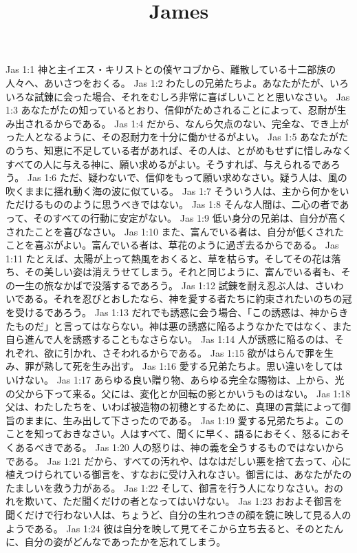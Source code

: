 

\title{James}

Jas 1:1  神と主イエス・キリストとの僕ヤコブから、離散している十二部族の人々へ、あいさつをおくる。
Jas 1:2  わたしの兄弟たちよ。あなたがたが、いろいろな試錬に会った場合、それをむしろ非常に喜ばしいことと思いなさい。
Jas 1:3  あなたがたの知っているとおり、信仰がためされることによって、忍耐が生み出されるからである。
Jas 1:4  だから、なんら欠点のない、完全な、でき上がった人となるように、その忍耐力を十分に働かせるがよい。
Jas 1:5  あなたがたのうち、知恵に不足している者があれば、その人は、とがめもせずに惜しみなくすべての人に与える神に、願い求めるがよい。そうすれば、与えられるであろう。
Jas 1:6  ただ、疑わないで、信仰をもって願い求めなさい。疑う人は、風の吹くままに揺れ動く海の波に似ている。
Jas 1:7  そういう人は、主から何かをいただけるもののように思うべきではない。
Jas 1:8  そんな人間は、二心の者であって、そのすべての行動に安定がない。
Jas 1:9  低い身分の兄弟は、自分が高くされたことを喜びなさい。
Jas 1:10  また、富んでいる者は、自分が低くされたことを喜ぶがよい。富んでいる者は、草花のように過ぎ去るからである。
Jas 1:11  たとえば、太陽が上って熱風をおくると、草を枯らす。そしてその花は落ち、その美しい姿は消えうせてしまう。それと同じように、富んでいる者も、その一生の旅なかばで没落するであろう。
Jas 1:12  試錬を耐え忍ぶ人は、さいわいである。それを忍びとおしたなら、神を愛する者たちに約束されたいのちの冠を受けるであろう。
Jas 1:13  だれでも誘惑に会う場合、「この誘惑は、神からきたものだ」と言ってはならない。神は悪の誘惑に陥るようなかたではなく、また自ら進んで人を誘惑することもなさらない。
Jas 1:14  人が誘惑に陥るのは、それぞれ、欲に引かれ、さそわれるからである。
Jas 1:15  欲がはらんで罪を生み、罪が熟して死を生み出す。
Jas 1:16  愛する兄弟たちよ。思い違いをしてはいけない。
Jas 1:17  あらゆる良い贈り物、あらゆる完全な賜物は、上から、光の父から下って来る。父には、変化とか回転の影とかいうものはない。
Jas 1:18  父は、わたしたちを、いわば被造物の初穂とするために、真理の言葉によって御旨のままに、生み出して下さったのである。
Jas 1:19  愛する兄弟たちよ。このことを知っておきなさい。人はすべて、聞くに早く、語るにおそく、怒るにおそくあるべきである。
Jas 1:20  人の怒りは、神の義を全うするものではないからである。
Jas 1:21  だから、すべての汚れや、はなはだしい悪を捨て去って、心に植えつけられている御言を、すなおに受け入れなさい。御言には、あなたがたのたましいを救う力がある。
Jas 1:22  そして、御言を行う人になりなさい。おのれを欺いて、ただ聞くだけの者となってはいけない。
Jas 1:23  おおよそ御言を聞くだけで行わない人は、ちょうど、自分の生れつきの顔を鏡に映して見る人のようである。
Jas 1:24  彼は自分を映して見てそこから立ち去ると、そのとたんに、自分の姿がどんなであったかを忘れてしまう。
